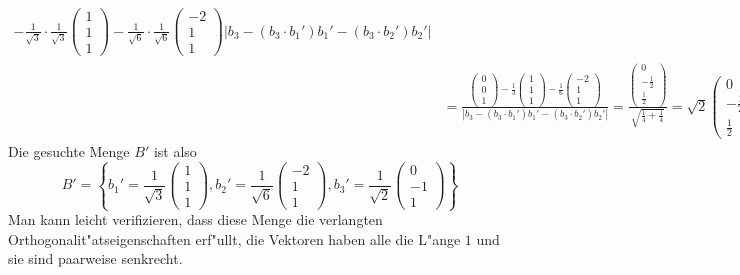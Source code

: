 \begin{beispiel}
\begin{align*}
{-\frac1{\sqrt{3}}\cdot\frac1{\sqrt{3}}\begin{pmatrix}1\\1\\1\end{pmatrix}
-\frac1{\sqrt{6}}\cdot\frac1{\sqrt{6}}\begin{pmatrix}-2\\1\\1\end{pmatrix}
}{
|b_3-(b_3\cdot b_1')b_1'-(b_3\cdot b_2')b_2'|
}
\\
&
=
\frac{
\begin{pmatrix}0\\0\\1\end{pmatrix}
-\frac13\begin{pmatrix}1\\1\\1\end{pmatrix}
-\frac16\begin{pmatrix}-2\\1\\1\end{pmatrix}
}{
|b_3-(b_3\cdot b_1')b_1'-(b_3\cdot b_2')b_2'|
}
=
\frac{
\begin{pmatrix}0\\-\frac12\\\frac12\end{pmatrix}
}{
\sqrt{\frac14+\frac14}
}
=\sqrt{2}
\begin{pmatrix}0\\-\frac12\\\frac12\end{pmatrix}
\end{align*}
Die gesuchte Menge $B'$ ist also
\[
B'=\left\{
b_1'=\frac1{\sqrt{3}}\begin{pmatrix}1\\1\\1\end{pmatrix},
b_2'=\frac1{\sqrt{6}}\begin{pmatrix}-2\\1\\1\end{pmatrix},
b_3'=\frac1{\sqrt{2}}\begin{pmatrix}0\\-1\\1\end{pmatrix}
\right\}
\]
Man kann leicht verifizieren, dass diese Menge die verlangten
Orthogonalit"atseigenschaften erf"ullt, die Vektoren haben
alle die L"ange $1$ und sie sind paarweise senkrecht.
\end{beispiel}

